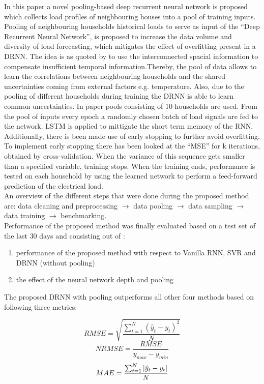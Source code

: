 In this paper \cite{Shi2018} a novel pooling-based deep recurrent neural network is proposed which collects load profiles of neighbouring houses into a pool of training inputs. Pooling of neighbouring households historical loads to serve as input of the ``Deep Recurrent Neural Network'', is proposed to increase the data volume and diversity of load forecasting, which mitigates the effect of overfitting present in a DRNN. The idea is as quoted by \cite{Shi2018} to use the interconnected spacial information to compensate insufficient temporal information.Thereby, the pool of data allows to learn the correlations between neighbouring households and the shared uncertainties coming from external factors e.g. temperature.  Also, due to the pooling of different households during training the DRNN is able to learn common uncertainties. In paper \cite{Shi2018} pools consisting of $ 10 $ households are used. From the pool of inputs every epoch a randomly chosen batch of load signals are fed to the network. LSTM is applied to mittigate the short term memory of the RNN. Additionally, there is been made use of early stopping to further avoid overfitting. To implement early stopping there has been looked at the ``MSE'' for k iterations, obtained by cross-validation. When the variance of this sequence gets smaller than a specified variable, training stops. When the training ends, performance is tested on each household by using the learned network to perform a feed-forward prediction of the electrical load.\\

An overview of the different steps that were done during the proposed method are: data cleaning and preprocessing $\rightarrow$ data pooling $\rightarrow$ data sampling $\rightarrow$ data training $\rightarrow$ benchmarking.\\

Performance of the proposed method was finally evaluated based on a test set of the last $ 30 $ days and consisting out of : 
\begin{enumerate}
	\item performance of the proposed method with respect to Vanilla RNN, SVR and DRNN (without pooling)
	\item the effect of the neural network depth and pooling
\end{enumerate}

The proposed DRNN with pooling outperforms all other four methods based on following three metrics:

\begin{equation}
	RMSE = \sqrt{\frac{\sum_{t=1}^{N}(\hat{y}_t-y_t)^2}{N}}
\end{equation}
\begin{equation}
	NRMSE = \frac{RMSE}{y_{max}-y_{min}}
\end{equation}
\begin{equation}
	MAE = \frac{\sum_{t=1}^{N}\abs{\hat{y}_t-y_t}}{N}
\end{equation}

